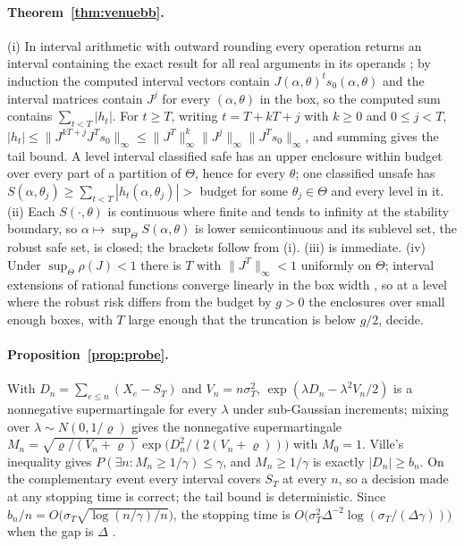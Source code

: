 \paragraph{Theorem~\ref{thm:venuebb}.} (i) In interval arithmetic with outward rounding every operation returns an interval containing the exact result for all real arguments in its operands \citep{rump2010}; by induction the computed interval vectors contain $J(\alpha,\theta)^ts_0(\alpha,\theta)$ and the interval matrices contain $J^j$ for every $(\alpha,\theta)$ in the box, so the computed sum contains $\sum_{t<T}|h_t|$. For $t\ge T$, writing $t=T+kT+j$ with $k\ge0$ and $0\le j<T$, $|h_t|\le\|J^{kT+j}J^Ts_0\|_\infty\le\|J^T\|_\infty^k\|J^j\|_\infty\|J^Ts_0\|_\infty$, and summing gives the tail bound. A level interval classified safe has an upper enclosure within budget over every part of a partition of $\Theta$, hence for every $\theta$; one classified unsafe has $S(\alpha,\theta_j)\ge\sum_{t<T}|h_t(\alpha,\theta_j)|>$ budget for some $\theta_j\in\Theta$ and every level in it. (ii) Each $S(\cdot,\theta)$ is continuous where finite and tends to infinity at the stability boundary, so $\alpha\mapsto\sup_\Theta S(\alpha,\theta)$ is lower semicontinuous and its sublevel set, the robust safe set, is closed; the brackets follow from (i). (iii) is immediate. (iv) Under $\sup_\Theta\rho(J)<1$ there is $T$ with $\|J^T\|_\infty<1$ uniformly on $\Theta$; interval extensions of rational functions converge linearly in the box width \citep{hansen2004}, so at a level where the robust risk differs from the budget by $g>0$ the enclosures over small enough boxes, with $T$ large enough that the truncation is below $g/2$, decide.

\paragraph{Proposition~\ref{prop:probe}.} With $D_n=\sum_{e\le n}(X_e-S_T)$ and $V_n=n\sigma_T^2$, $\exp(\lambda D_n-\lambda^2V_n/2)$ is a nonnegative supermartingale for every $\lambda$ under sub-Gaussian increments; mixing over $\lambda\sim N(0,1/\varrho)$ gives the nonnegative supermartingale $M_n=\sqrt{\varrho/(V_n+\varrho)}\exp\bigl(D_n^2/(2(V_n+\varrho))\bigr)$ with $M_0=1$. Ville's inequality \citep{ville1939} gives $P(\exists n:M_n\ge1/\gamma)\le\gamma$, and $M_n\ge1/\gamma$ is exactly $|D_n|\ge b_n$. On the complementary event every interval covers $S_T$ at every $n$, so a decision made at any stopping time is correct; the tail bound is deterministic. Since $b_n/n=O\bigl(\sigma_T\sqrt{\log(n/\gamma)/n}\bigr)$, the stopping time is $O\bigl(\sigma_T^2\Delta^{-2}\log(\sigma_T/(\Delta\gamma))\bigr)$ when the gap is $\Delta$ \citep{howard2021}.

